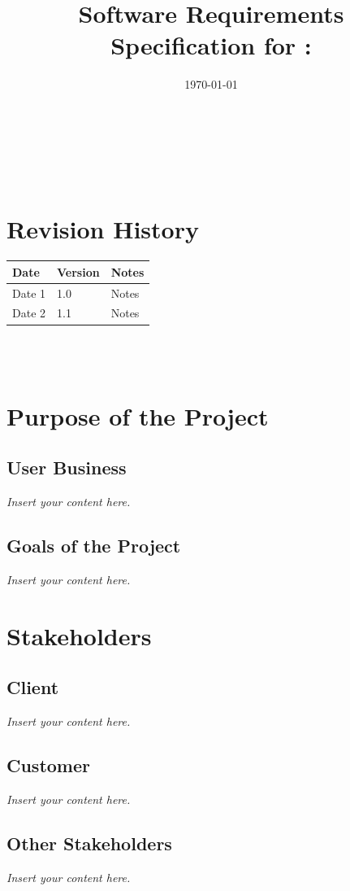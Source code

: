\documentclass[12pt]{article}
\newcommand{\lips}{\textit{Insert your content here.}}
\begin{document}
\title{Software Requirements Specification for \progname: \prjdesc}
\author{\authname}
\date{\today}

\maketitle

~\newpage


\tableofcontents

~\newpage

\section*{Revision History}

\begin{tabularx}{\textwidth}{p{3cm}p{2cm}X}
\toprule {\textbf{Date}} & {\textbf{Version}} & {\textbf{Notes}}\\
\midrule
Date 1 & 1.0 & Notes\\
Date 2 & 1.1 & Notes\\
\bottomrule
\end{tabularx}

~\\

~\newpage
\section{Purpose of the Project}
\subsection{User Business}
\lips
\subsection{Goals of the Project}
\lips
\section{Stakeholders}
\subsection{Client}
\lips
\subsection{Customer}
\lips
\subsection{Other Stakeholders}
\lips
\end{document}
